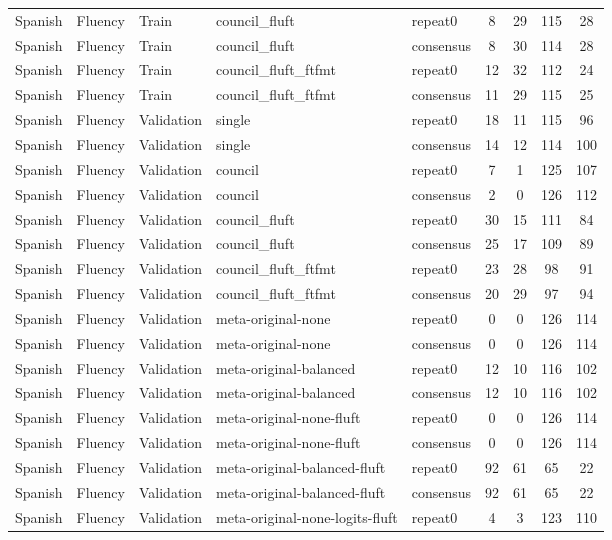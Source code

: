 \begin{tabular}{lllllcccc}
Spanish & Fluency & Train & council\_fluft & repeat0 & 8 & 29 & 115 & 28 \\
Spanish & Fluency & Train & council\_fluft & consensus & 8 & 30 & 114 & 28 \\
Spanish & Fluency & Train & council\_fluft\_ftfmt & repeat0 & 12 & 32 & 112 & 24 \\
Spanish & Fluency & Train & council\_fluft\_ftfmt & consensus & 11 & 29 & 115 & 25 \\
Spanish & Fluency & Validation & single & repeat0 & 18 & 11 & 115 & 96 \\
Spanish & Fluency & Validation & single & consensus & 14 & 12 & 114 & 100 \\
Spanish & Fluency & Validation & council & repeat0 & 7 & 1 & 125 & 107 \\
Spanish & Fluency & Validation & council & consensus & 2 & 0 & 126 & 112 \\
Spanish & Fluency & Validation & council\_fluft & repeat0 & 30 & 15 & 111 & 84 \\
Spanish & Fluency & Validation & council\_fluft & consensus & 25 & 17 & 109 & 89 \\
Spanish & Fluency & Validation & council\_fluft\_ftfmt & repeat0 & 23 & 28 & 98 & 91 \\
Spanish & Fluency & Validation & council\_fluft\_ftfmt & consensus & 20 & 29 & 97 & 94 \\
Spanish & Fluency & Validation & meta-original-none & repeat0 & 0 & 0 & 126 & 114 \\
Spanish & Fluency & Validation & meta-original-none & consensus & 0 & 0 & 126 & 114 \\
Spanish & Fluency & Validation & meta-original-balanced & repeat0 & 12 & 10 & 116 & 102 \\
Spanish & Fluency & Validation & meta-original-balanced & consensus & 12 & 10 & 116 & 102 \\
Spanish & Fluency & Validation & meta-original-none-fluft & repeat0 & 0 & 0 & 126 & 114 \\
Spanish & Fluency & Validation & meta-original-none-fluft & consensus & 0 & 0 & 126 & 114 \\
Spanish & Fluency & Validation & meta-original-balanced-fluft & repeat0 & 92 & 61 & 65 & 22 \\
Spanish & Fluency & Validation & meta-original-balanced-fluft & consensus & 92 & 61 & 65 & 22 \\
Spanish & Fluency & Validation & meta-original-none-logits-fluft & repeat0 & 4 & 3 & 123 & 110 \\

\end{tabular}
